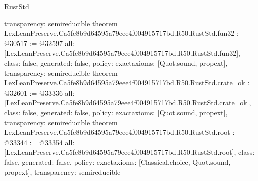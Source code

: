 \begin{lexlean}{RustStd}
\begin{coremodule}
{  transparency: semireducible
}
theorem LexLeanPreserve.Ca5fe8b9d64595a79eee4f004915717bd.R50.RustStd.fun32 : @30517 := @32597 {
  all: [LexLeanPreserve.Ca5fe8b9d64595a79eee4f004915717bd.R50.RustStd.fun32],
  class: false,
  generated: false,
  policy: exact{axioms: [Quot.sound, propext]},
  transparency: semireducible
}
theorem LexLeanPreserve.Ca5fe8b9d64595a79eee4f004915717bd.R50.RustStd.crate_ok : @32601 := @33336 {
  all: [LexLeanPreserve.Ca5fe8b9d64595a79eee4f004915717bd.R50.RustStd.crate_ok],
  class: false,
  generated: false,
  policy: exact{axioms: [Quot.sound, propext]},
  transparency: semireducible
}
theorem LexLeanPreserve.Ca5fe8b9d64595a79eee4f004915717bd.R50.RustStd.root : @33344 := @33354 {
  all: [LexLeanPreserve.Ca5fe8b9d64595a79eee4f004915717bd.R50.RustStd.root],
  class: false,
  generated: false,
  policy: exact{axioms: [Classical.choice, Quot.sound, propext]},
  transparency: semireducible
}


\end{coremodule}
\end{lexlean}
